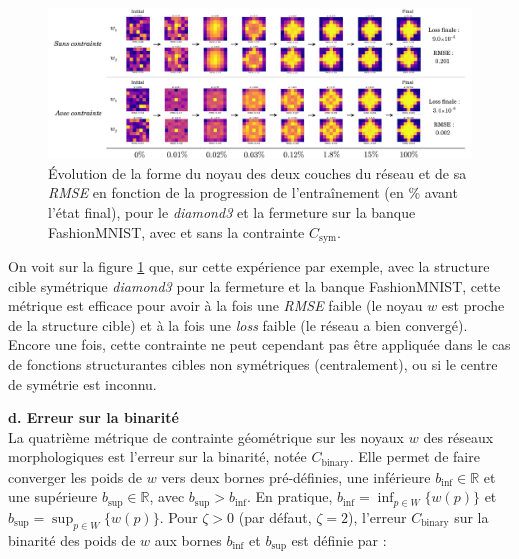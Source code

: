 \vspace{-0.2mm}
\begin{figure}[htp]
  \begin{center}
    \includegraphics[width=1.00\linewidth]{parts/3-contributions/C-contraintes_geometriques/figures/k_sym.pdf}
    \vspace{-4.0mm}
    \caption{ \centering Évolution de la forme du noyau des deux couches du réseau et de sa \textit{RMSE} en fonction de la progression de l'entraînement (en \% avant l'état final), pour le \textit{diamond3} et la fermeture sur la banque FashionMNIST, avec et sans la contrainte $C_\text{sym}$.}
    \label{fig:c_sym}
  \end{center}
\end{figure}

\vspace{-2.4mm}
\noindent On voit sur la figure \ref{fig:c_sym} que, sur cette expérience par exemple, avec la structure cible symétrique \textit{diamond3} pour la fermeture et la banque FashionMNIST, cette métrique est efficace pour avoir à la fois une \textit{RMSE} faible (le noyau $w$ est proche de la structure cible) et à la fois une \textit{loss} faible (le réseau a bien convergé).
Encore une fois, cette contrainte ne peut cependant pas être appliquée dans le cas de fonctions structurantes cibles non symétriques (centralement), ou si le centre de symétrie est inconnu.



\newpage

\noindent \textbf{d. Erreur sur la binarité}\\

La quatrième métrique de contrainte géométrique sur les noyaux $w$ des réseaux morphologiques est l'erreur sur la binarité, notée $C_\text{binary}$. Elle permet de faire converger les poids de $w$ vers deux bornes pré-définies, une inférieure $b_\text{inf} \in \mathbb{R}$ et une supérieure $b_\text{sup} \in \mathbb{R}$, avec $b_\text{sup} > b_\text{inf}$. En pratique, $b_\text{inf} = \inf_{p \in W} \{ w(p) \}$ et $b_\text{sup} = \sup_{p \in W} \{ w(p) \}$. Pour $\zeta > 0$ (par défaut, $\zeta = 2$), l'erreur $C_\text{binary}$ sur la binarité des poids de $w$ aux bornes $b_\text{inf}$ et $b_\text{sup}$ est définie par :

